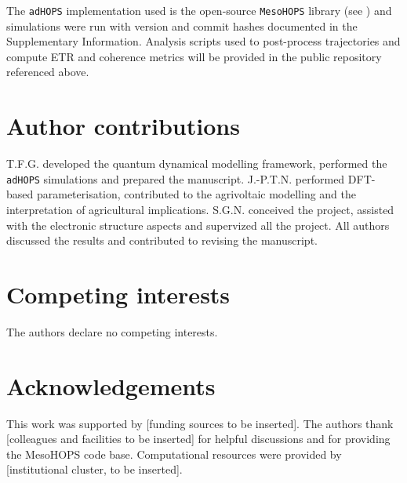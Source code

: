 \documentclass[aps,prb,onecolumn,superscriptaddress,notitlepage,nofootinbib,longbibliography,10pt]{revtex4-2}
\begin{document}
The \texttt{adHOPS} implementation used is the open-source \texttt{MesoHOPS} library (see \cite{Citty2024}) and simulations were run with version and commit hashes documented in the Supplementary Information. Analysis scripts used to post-process trajectories and compute ETR and coherence metrics will be provided in the public repository referenced above.

\section*{Author contributions}

T.F.G. developed the quantum dynamical modelling framework, performed the \texttt{adHOPS} simulations and prepared the manuscript. J.-P.T.N. performed DFT-based parameterisation, contributed to the agrivoltaic modelling and the interpretation of agricultural implications. S.G.N. conceived the project, assisted with the electronic structure aspects and supervized all the project. All authors discussed the results and contributed to revising the manuscript.

\section*{Competing interests}
The authors declare no competing interests.

\section*{Acknowledgements}
This work was supported by [funding sources to be inserted]. The authors thank [colleagues and facilities to be inserted] for helpful discussions and for providing the MesoHOPS code base. Computational resources were provided by [institutional cluster, to be inserted].


\end{document}
